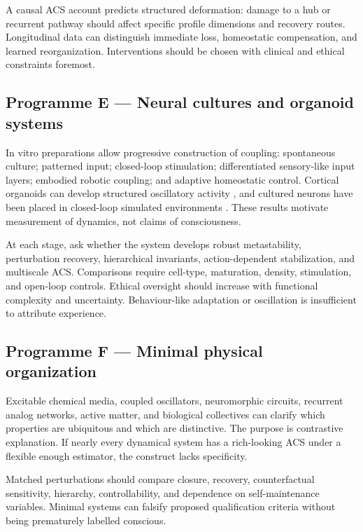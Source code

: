 \documentclass[
  11pt,
  a4paper,
]{article}
\begin{document}
A causal ACS account predicts structured deformation: damage to a hub or
recurrent pathway should affect specific profile dimensions and recovery
routes. Longitudinal data can distinguish immediate loss, homeostatic
compensation, and learned reorganization. Interventions should be chosen
with clinical and ethical constraints foremost.

\subsection{Programme E --- Neural cultures and organoid
systems}\label{programme-e-neural-cultures-and-organoid-systems}

In vitro preparations allow progressive construction of coupling:
spontaneous culture; patterned input; closed-loop stimulation;
differentiated sensory-like input layers; embodied robotic coupling; and
adaptive homeostatic control. Cortical organoids can develop structured
oscillatory activity \citep{trujillo2019}, and cultured neurons have
been placed in closed-loop simulated environments \citep{kagan2022}.
These results motivate measurement of dynamics, not claims of
consciousness.

At each stage, ask whether the system develops robust metastability,
perturbation recovery, hierarchical invariants, action-dependent
stabilization, and multiscale ACS. Comparisons require cell-type,
maturation, density, stimulation, and open-loop controls. Ethical
oversight should increase with functional complexity and uncertainty.
Behaviour-like adaptation or oscillation is insufficient to attribute
experience.

\subsection{Programme F --- Minimal physical
organization}\label{programme-f-minimal-physical-organization}

Excitable chemical media, coupled oscillators, neuromorphic circuits,
recurrent analog networks, active matter, and biological collectives can
clarify which properties are ubiquitous and which are distinctive. The
purpose is contrastive explanation. If nearly every dynamical system has
a rich-looking ACS under a flexible enough estimator, the construct
lacks specificity.

Matched perturbations should compare closure, recovery, counterfactual
sensitivity, hierarchy, controllability, and dependence on
self-maintenance variables. Minimal systems can falsify proposed
qualification criteria without being prematurely labelled conscious.
\end{document}
